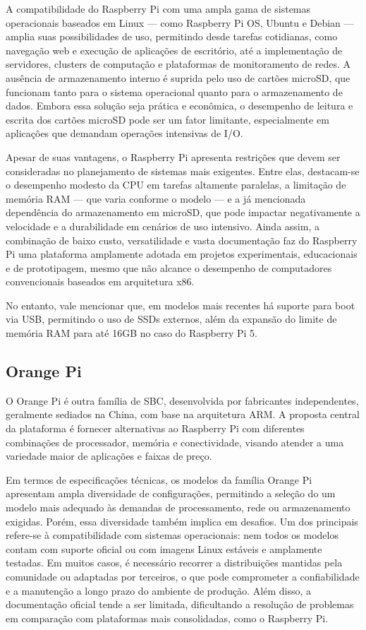 A compatibilidade do Raspberry Pi com uma ampla gama de sistemas operacionais baseados em Linux — como Raspberry Pi OS, Ubuntu e Debian — amplia suas possibilidades de uso, permitindo desde tarefas cotidianas, como navegação web e execução de aplicações de escritório, até a implementação de servidores, clusters de computação e plataformas de monitoramento de redes. A ausência de armazenamento interno é suprida pelo uso de cartões microSD, que funcionam tanto para o sistema operacional quanto para o armazenamento de dados. Embora essa solução seja prática e econômica, o desempenho de leitura e escrita dos cartões microSD pode ser um fator limitante, especialmente em aplicações que demandam operações intensivas de I/O.

Apesar de suas vantagens, o Raspberry Pi apresenta restrições que devem ser consideradas no planejamento de sistemas mais exigentes. Entre elas, destacam-se o desempenho modesto da CPU em tarefas altamente paralelas, a limitação de memória RAM — que varia conforme o modelo — e a já mencionada dependência do armazenamento em microSD, que pode impactar negativamente a velocidade e a durabilidade em cenários de uso intensivo. Ainda assim, a combinação de baixo custo, versatilidade e vasta documentação faz do Raspberry Pi uma plataforma amplamente adotada em projetos experimentais, educacionais e de prototipagem, mesmo que não alcance o desempenho de computadores convencionais baseados em arquitetura x86.

No entanto, vale mencionar que, em modelos mais recentes há suporte para boot via USB, permitindo o uso de SSDs externos, além da expansão do limite de memória RAM para até 16GB no caso do Raspberry Pi 5. 

\subsection{Orange Pi}

O Orange Pi é outra família de SBC, desenvolvida por fabricantes independentes, geralmente sediados na China, com base na arquitetura ARM. A proposta central da plataforma é fornecer alternativas ao Raspberry Pi com diferentes combinações de processador, memória e conectividade, visando atender a uma variedade maior de aplicações e faixas de preço.

Em termos de especificações técnicas, os modelos da família Orange Pi apresentam ampla diversidade de configurações, permitindo a seleção do um modelo mais adequado às demandas de processamento, rede ou armazenamento exigidas. Porém, essa diversidade também implica em desafios. Um dos principais refere-se à compatibilidade com sistemas operacionais: nem todos os modelos contam com suporte oficial ou com imagens Linux estáveis e amplamente testadas. Em muitos casos, é necessário recorrer a distribuições mantidas pela comunidade ou adaptadas por terceiros, o que pode comprometer a confiabilidade e a manutenção a longo prazo do ambiente de produção. Além disso, a documentação oficial tende a ser limitada, dificultando a resolução de problemas em comparação com plataformas mais consolidadas, como o Raspberry Pi.


